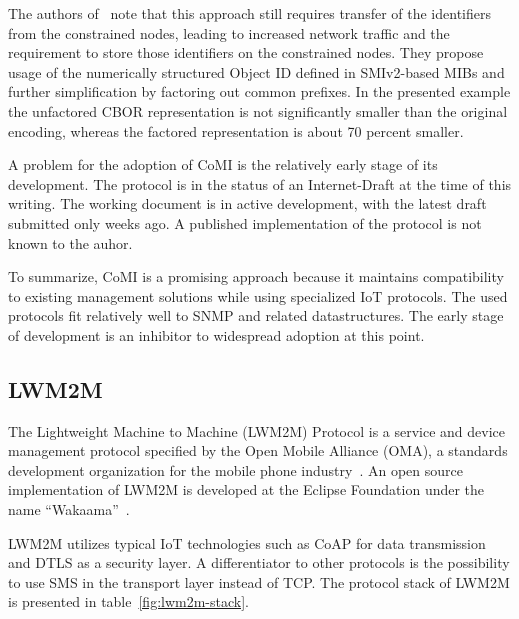 \documentclass[conference]{IEEEtran}
\begin{document}
The authors of~\cite{Bergmann} note that this approach still requires transfer of the identifiers from the constrained nodes, leading to increased network traffic and the requirement to store those identifiers on the constrained nodes. They propose usage of the numerically structured Object ID defined in SMIv2-based MIBs and further simplification by factoring out common prefixes. In the presented example the unfactored CBOR representation is not significantly smaller than the original encoding, whereas the factored representation is about 70 percent smaller.

A problem for the adoption of CoMI is the relatively early stage of its development. The protocol is in the status of an Internet-Draft at the time of this writing. The working document is in active development, with the latest draft submitted only weeks ago\cite{draft-vanderstok-core-comi-04}. A published implementation of the protocol is not known to the auhor.

To summarize, CoMI is a promising approach because it maintains compatibility to existing management solutions while using specialized IoT protocols. The used protocols fit relatively well to SNMP and related datastructures. The early stage of development is an inhibitor to widespread adoption at this point.




\subsection{LWM2M} %
\label{sub:lwm2m}
The Lightweight Machine to Machine (LWM2M) Protocol is a service and device management protocol specified by the Open Mobile Alliance (OMA), a standards development organization for the mobile phone industry~\cite{yucianga-lwm2m}. An open source implementation of LWM2M is developed at the Eclipse Foundation under the name ``Wakaama''~\cite{eclipse-wakaama}.

LWM2M utilizes typical IoT technologies such as CoAP for data transmission and DTLS as a security layer. A differentiator to other protocols is the possibility to use SMS in the transport layer instead of TCP. The protocol stack of LWM2M is presented in table~\ref{fig:lwm2m-stack}.
\end{document}
